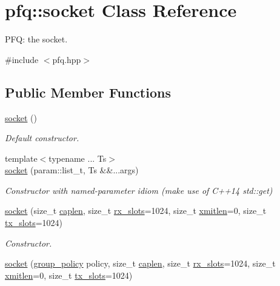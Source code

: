 \hypertarget{classpfq_1_1socket}{}\section{pfq\+:\+:socket Class Reference}
\label{classpfq_1_1socket}


P\+FQ\+: the socket.  




{\ttfamily \#include $<$pfq.\+hpp$>$}

\subsection*{Public Member Functions}
\begin{DoxyCompactItemize}
\item 
\hyperlink{classpfq_1_1socket_a169a46cd01a5fd0a71919ece48f18d9d}{socket} ()
\begin{DoxyCompactList}\small\item\em Default constructor. \end{DoxyCompactList}\item 
{\footnotesize template$<$typename ... Ts$>$ }\\\hyperlink{classpfq_1_1socket_aa53695f39b45a0fa9520d52a1a35d2bf}{socket} (param\+::list\+\_\+t, Ts \&\&...args)
\begin{DoxyCompactList}\small\item\em Constructor with named-\/parameter idiom (make use of C++14 std\+::get) \end{DoxyCompactList}\item 
\hyperlink{classpfq_1_1socket_af2e952a1d5933ea76db2fbbba0fdf92a}{socket} (size\+\_\+t \hyperlink{classpfq_1_1socket_ab68dbba5ef01041b9c96758c4a9f0a6c}{caplen}, size\+\_\+t \hyperlink{classpfq_1_1socket_a5cf700fc12d67b91df3d669ac4aa737a}{rx\+\_\+slots}=1024, size\+\_\+t \hyperlink{classpfq_1_1socket_a142d9760fcef01b426c3afb4005400d9}{xmitlen}=0, size\+\_\+t \hyperlink{classpfq_1_1socket_a019d15a072c043d6a1333ca0c836da4c}{tx\+\_\+slots}=1024)
\begin{DoxyCompactList}\small\item\em Constructor. \end{DoxyCompactList}\item 
\hyperlink{classpfq_1_1socket_ab502dbc0907cbbe0168ea0837178d86a}{socket} (\hyperlink{namespacepfq_ac41249c8510558905b01fa4d866a38d7}{group\+\_\+policy} policy, size\+\_\+t \hyperlink{classpfq_1_1socket_ab68dbba5ef01041b9c96758c4a9f0a6c}{caplen}, size\+\_\+t \hyperlink{classpfq_1_1socket_a5cf700fc12d67b91df3d669ac4aa737a}{rx\+\_\+slots}=1024, size\+\_\+t \hyperlink{classpfq_1_1socket_a142d9760fcef01b426c3afb4005400d9}{xmitlen}=0, size\+\_\+t \hyperlink{classpfq_1_1socket_a019d15a072c043d6a1333ca0c836da4c}{tx\+\_\+slots}=1024)

\end{DoxyCompactItemize}

